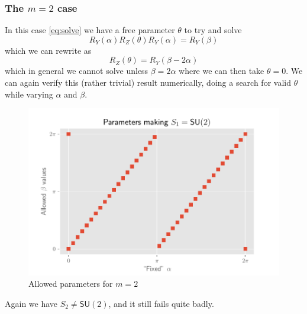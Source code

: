 \documentclass[12pt,dvipsnames]{article}
\newcommand{\SU}[1]{\mathsf{SU} (#1)}
\newcommand{\1}{\mathbb{1}}
\theoremstyle{plain}
\begin{document}
\subsubsection{The $m = 2$ case}
In this case \cref{eq:solve} we have a free parameter $\theta$ to try and solve
\begin{equation}
    R_Y(\alpha)R_Z(\theta)R_Y(\alpha) = R_Y(\beta)
\end{equation}
which we can rewrite as
\begin{equation}
    R_Z(\theta) = R_Y(\beta - 2\alpha)
\end{equation}
which in general we cannot solve unless $\beta = 2\alpha$ where we can then take $\theta = 0$. We can again verify this (rather trivial) result numerically, doing a search for valid $\theta$ while varying $\alpha$ and $\beta$.
\begin{figure}[h]
    \begin{minipage}[c]{0.7\textwidth}
        \includegraphics[width=\textwidth]{../su2/s1.pdf}
    \end{minipage}\hfill
    \begin{minipage}[c]{0.3\textwidth}
        \caption{Allowed parameters for $m = 2$}\label{fig:m=2}
    \end{minipage}
\end{figure}

Again we have $S_2\neq \SU{2}$, and it still fails quite badly.
\end{document}
